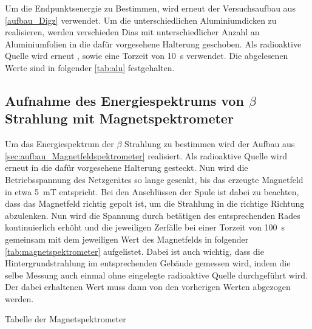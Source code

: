 \documentclass[12pt,english,ngerman]{scrartcl}
\begin{document}
Um die Endpunktsenergie zu Bestimmen, wird erneut der Versuchsaufbau aus \autoref{aufbau_Digz} verwendet. Um die unterschiedlichen
Aluminiumdicken zu realisieren, werden verschieden Dias mit unterschiedlicher Anzahl an Aluminiumfolien in die dafür vorgesehene
Halterung geschoben. Als radioaktive Quelle wird erneut , sowie eine Torzeit von \SI{10}{\second} verwendet. Die abgelesenen 
Werte sind in folgender \autoref{tab:alu} festgehalten.

%     

\subsection{Aufnahme des Energiespektrums von \texorpdfstring{$\beta$}{beta} Strahlung mit Magnetspektrometer}

Um das Energiespektrum der $\beta$ Strahlung zu bestimmen wird der Aufbau aus \autoref{sec:aufbau_Magnetfeldspektrometer} realisiert.
Als radioaktive Quelle wird erneut  in die dafür vorgesehene Halterung gesteckt. Nun wird die Betriebsspannung des
Netzgerätes so lange gesenkt, bis das erzeugte Magnetfeld in etwa \SI{5}{\milli\tesla} entspricht. Bei den Anschlüssen der 
Spule ist dabei zu beachten, dass das Magnetfeld richtig gepolt ist, um die Strahlung
in die richtige Richtung abzulenken. Nun wird die Spannung durch betätigen des entsprechenden Rades kontinuierlich erhöht
und die jeweiligen Zerfälle bei einer Torzeit von \SI{100}{\second} gemeinsam mit dem jeweiligen Wert des Magnetfelds in folgender
\autoref{tab:magnetspektrometer} aufgelistet. Dabei ist auch wichtig, dass die Hintergrundstrahlung im entsprechenden Gebäude
gemessen wird, indem die selbe Messung auch einmal ohne eingelegte radioaktive Quelle durchgeführt wird. Der dabei erhaltenen
Wert muss dann von den vorherigen Werten abgezogen werden.

\begin{table}
  \caption{Tabelle der Magnetspektrometer}
  \label{tab:magnetspektrometer}
  \begin{center}
    
  \end{center}
\end{table}
\end{document}
